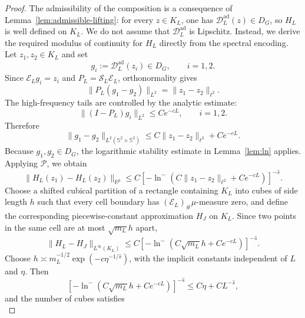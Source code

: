 \documentclass{article}
\numberwithin{equation}{section}
\theoremstyle{plain}
\begin{document}
	\begin{proof}
	The admissibility of the composition is a consequence of Lemma~\ref{lem:admissible-lifting}: for every $z\in K_L$, one has $\mathcal D_L^{\mathrm{ad}}(z)\in D_G$, so $H_L$ is well defined on $K_L$. We do not assume that $\mathcal D_L^{\mathrm{ad}}$ is Lipschitz. Instead, we derive the required modulus of continuity for $H_L$ directly from the spectral encoding.
	Let $z_1,z_2\in K_L$ and set
	\begin{equation*}
	g_i:=\mathcal D_L^{\mathrm{ad}}(z_i)\in D_G,\qquad i=1,2.
	\end{equation*}
	Since $\mathcal E_Lg_i=z_i$ and $P_L=\mathcal S_L\mathcal E_L$, orthonormality gives
	\begin{equation*}
		\|P_L(g_1-g_2)\|_{L^2}
		=
		\|z_1-z_2\|_{\ell^2}.
	\end{equation*}
	The high-frequency tails are controlled by the analytic estimate:
	\begin{equation*}
	\|(I-P_L)g_i\|_{L^2}\le Ce^{-cL},\qquad i=1,2.
	\end{equation*}
	Therefore
	\begin{equation*}
	\|g_1-g_2\|_{L^2(\mathbb S^2\times\mathbb S^2)}
	\le C\|z_1-z_2\|_{\ell^2}+Ce^{-cL}.
	\end{equation*}
	Because $g_1,g_2\in D_G$, the logarithmic stability estimate in Lemma~\ref{lem:ln} applies. Applying $\mathcal P$, we obtain
	\begin{equation*}
	\|H_L(z_1)-H_L(z_2)\|_{\mathbb R^p}
	\le C\left[-\ln^{-}\left(C\|z_1-z_2\|_{\ell^2}+Ce^{-cL}\right)\right]^{-\hat s}.
	\end{equation*}
	Choose a shifted cubical partition of a rectangle containing $K_L$ into cubes of side length $h$ such that every cell boundary has $(\mathcal E_L)_{\#}\mu$-measure zero, and define the corresponding piecewise-constant approximation $H_J$ on $K_L$. Since two points in the same cell are at most $\sqrt{m_L}h$ apart,
	\begin{equation*}
		\|H_L-H_J\|_{L^\infty(K_L)}
		\le
		C\left[
		-\ln^{-}\left(C\sqrt{m_L}h+Ce^{-cL}\right)
		\right]^{-\hat s}.
	\end{equation*}
	Choose $h\asymp m_L^{-1/2}\exp(-c\eta^{-1/\hat s})$, with the implicit constants independent of $L$ and $\eta$. Then
	\begin{equation*}
		\left[
		-\ln^{-}\left(C\sqrt{m_L}h+Ce^{-cL}\right)
		\right]^{-\hat s}
		\le C\eta+CL^{-\hat s},
	\end{equation*}
	and the number of cubes satisfies
	\begin{equation*}

\end{equation*}
\end{proof}
\end{document}

